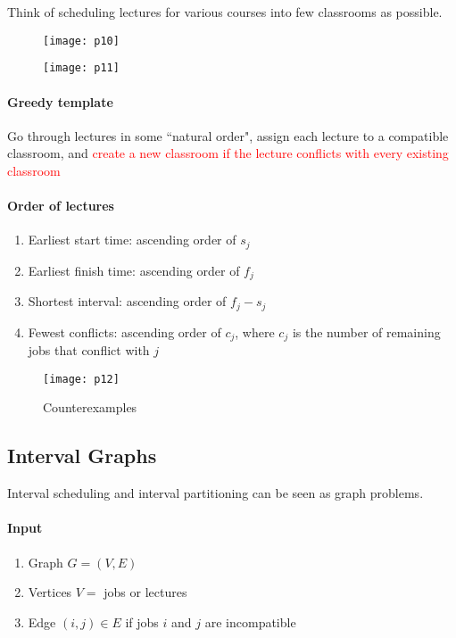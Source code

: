 \documentclass[11pt]{article}
\begin{document}
\noindent Think of scheduling lectures for various courses into few classrooms as possible.

\begin{figure}[h]
	\centering
	\texttt{[image: p10]}
\end{figure}

\begin{figure}[h]
	\centering
	\texttt{[image: p11]}
\end{figure}

\paragraph{Greedy template}
Go through lectures in some ``natural order", assign each lecture to a compatible classroom, and \textcolor{red}{create a new classroom if the lecture conflicts with every existing classroom}

\paragraph{Order of lectures}
\begin{enumerate}
	\item Earliest start time: ascending order of $s_j$
	\item Earliest finish time: ascending order of $f_j$
	\item Shortest interval: ascending order of $f_j - s_j$
	\item Fewest conflicts: ascending order of $c_j$, where $c_j$ is the number of remaining jobs that conflict with $j$
\end{enumerate}


\begin{figure}[h]
	\centering
	\texttt{[image: p12]}
	\caption{Counterexamples}
\end{figure}

\subsection{Interval Graphs}
Interval scheduling and interval partitioning can be seen as graph problems.
\paragraph{Input}
\begin{enumerate}
	\item Graph $G = (V, E)$
	\item Vertices $V = $ jobs or lectures
	\item Edge $(i, j) \in E$ if jobs $i$ and $j$ are incompatible
\end{enumerate}
\end{document}
